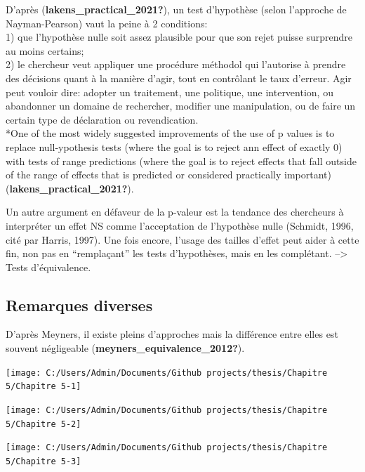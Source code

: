 \documentclass[
  english,
  man]{apa6}
\begin{document}
D'après (\textbf{lakens\_practical\_2021?}), un test d'hypothèse (selon l'approche de Nayman-Pearson) vaut la peine à 2 conditions:\\
1) que l'hypothèse nulle soit assez plausible pour que son rejet puisse surprendre au moins certains;\\
2) le chercheur veut appliquer une procédure méthodol qui l'autorise à prendre des décisions quant à la manière d'agir, tout en contrôlant le taux d'erreur. Agir peut vouloir dire: adopter un traitement, une politique, une intervention, ou abandonner un domaine de rechercher, modifier une manipulation, ou de faire un certain type de déclaration ou revendication.\\
*One of the most widely suggested improvements of the use of p values is to replace null-ypothesis tests (where the goal is to reject ann effect of exactly 0) with tests of range predictions (where the goal is to reject effects that fall outside of the range of effects that is predicted or considered practically important) (\textbf{lakens\_practical\_2021?}).

Un autre argument en défaveur de la p-valeur est la tendance des chercheurs à interpréter un effet NS comme l'acceptation de l'hypothèse nulle (Schmidt, 1996, cité par Harris, 1997). Une fois encore, l'usage des tailles d'effet peut aider à cette fin, non pas en ``remplaçant'' les tests d'hypothèses, mais en les complétant. --\textgreater{} Tests d'équivalence.

\hypertarget{remarques-diverses}{%
\subsection{Remarques diverses}\label{remarques-diverses}}

D'après Meyners, il existe pleins d'approches mais la différence entre elles est souvent négligeable (\textbf{meyners\_equivalence\_2012?}).

\begin{center}\texttt{[image: C:/Users/Admin/Documents/Github projects/thesis/Chapitre 5/Chapitre 5-1]} \end{center}

\begin{center}\texttt{[image: C:/Users/Admin/Documents/Github projects/thesis/Chapitre 5/Chapitre 5-2]} \end{center}

\begin{center}\texttt{[image: C:/Users/Admin/Documents/Github projects/thesis/Chapitre 5/Chapitre 5-3]} \end{center}
\end{document}
